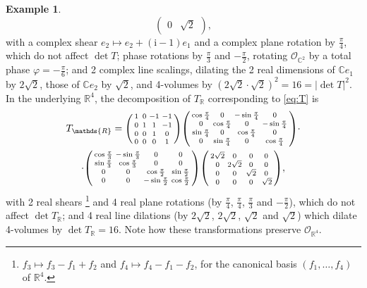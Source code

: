 \documentclass{birkjour}
\theoremstyle{definition}
\newtheorem{example}[theorem]{Example}
\def\R			{\mathds{R}}
\def\C			{\mathds{C}}
\def\OO			{\mathcal{O}}
\def\im	 					{\mathrm{i}}				%
\begin{document}
\begin{example}
\begin{equation}
\begin{pmatrix}
			0 & \sqrt{2}
		\end{pmatrix},
	\end{equation}
	with a complex shear $e_2 \mapsto e_2 + (\im-1) e_1$ and
	a complex plane rotation by $\frac\pi4$, which do not affect $\det T$;
	phase rotations by $\frac\pi3$ and $-\frac\pi2$,
	rotating $\OO_{\C^2}$ by a total phase $\varphi = -\frac\pi6$;
	and 2 complex line scalings, dilating the 2 real dimensions of $\C e_1$ by $2\sqrt{2}$, those of $\C e_2$ by $\sqrt{2}$, and 4-volumes by $(2\sqrt{2} \cdot \sqrt{2})^2 = 16 = |\det T|^2$.
	In the underlying $\R^4$, 
	the decomposition of $T_\R$ corresponding to \eqref{eq:T} is
	\begin{multline*}
		T_\R = 
		\begin{psmallmatrix}
			1 \,& 0 & -1 & -1 \\[2pt]
			0 \,& 1 & 1 & -1 \\[2pt]
			0 \,& 0 & 1 & 0 \\[2pt]
			0 \,& 0 & 0 & 1
		\end{psmallmatrix}
		\begin{psmallmatrix}
			\cos \frac\pi4 & 0 & -\sin \frac\pi4 & 0 \\
			0 & \cos \frac\pi4 & 0 & -\sin \frac\pi4 \\
			\sin \frac\pi4 & 0 & \cos \frac\pi4 & 0 \\
			0 & \sin \frac\pi4 & 0 & \cos \frac\pi4
		\end{psmallmatrix}
		\cdot \\ \cdot
		\begin{psmallmatrix}
			\cos \frac\pi3 & -\sin \frac\pi3 & 0 & 0 \\
			\sin \frac\pi3 & \cos \frac\pi3 & 0 & 0 \\
			0 & 0 & \cos \frac\pi2 & \sin \frac\pi2 \\
			0 & 0 & -\sin \frac\pi2 & \cos \frac\pi2
		\end{psmallmatrix}
		\begin{psmallmatrix}
			2\sqrt{2} & 0 & 0 & 0 \\
			0 & 2\sqrt{2} & 0 & 0 \\
			0 & 0 & \,\sqrt{2}\, & 0 \\
			0 & 0 & 0 & \,\sqrt{2}
		\end{psmallmatrix},
	\end{multline*}
	with 2 real shears%
		\footnote{$f_3 \mapsto f_3 - f_1 + f_2$ and $f_4 \mapsto f_4 - f_1 - f_2$, for the canonical basis $(f_1,\ldots,f_4)$ of $\R^4$.}
	and 4 real plane rotations (by $\frac\pi4$, $\frac\pi4$, $\frac\pi3$ and $-\frac\pi2$), which do not affect $\det T_\R$; and 4 real line dilations (by $2\sqrt{2}$, $2\sqrt{2}$, $\sqrt{2}$ and $\sqrt{2}$) which dilate 4-volumes by $\det T_\R = 16$.
	Note how these transformations preserve $\OO_{\R^4}$.
\end{example}
\end{document}
